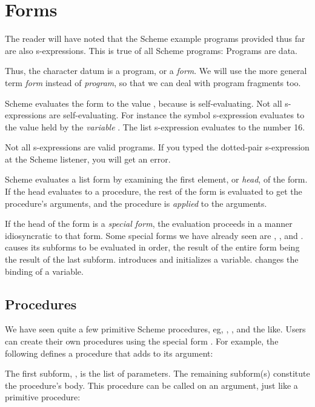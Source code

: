 \chapter{Forms}

The reader will have noted that the Scheme example
programs provided thus far are also s-expressions.
This is true of all Scheme programs: Programs are data.

Thus, the character datum \q{#\c} is a program, or a
{\em form}.  We will use the more general term {\em
form} instead of {\em program}, so that we can deal
with program fragments too.

Scheme evaluates the form \q{#\c} to the value \q{#\c},
because \q{#\c} is self-evaluating.  Not all
s-expressions are self-evaluating.  For instance the
symbol s-expression
 evaluates to the value held by the {\em variable}
.  The list s-expression
evaluates to the number 16.

Not all s-expressions are valid programs.  If you typed
the dotted-pair s-expression  at the Scheme
listener, you will get an error.

Scheme evaluates a list form by examining the first
element, or {\em head}, of the form.  If the head
evaluates to a procedure, the rest of the form is
evaluated to get the procedure's arguments, and the
procedure is {\em applied} to the arguments. 

If the head of the form is a {\em special form}, the
evaluation proceeds in a manner idiosyncratic to that
form.  Some special forms we have already seen
are , , and .   causes its
subforms to be evaluated in order, the result of the
entire form being the result of the last subform.
 introduces and initializes a variable.
 changes the binding of a variable.  

\section{Procedures}

We have seen quite a few primitive Scheme procedures,
eg, , , and the like.  Users
can create their own procedures using the special form
.  For example, the following defines a
procedure that adds  to its argument:


The first subform, , is the list of parameters.
The remaining subform(s) constitute the procedure's
body.  This procedure can be called on an argument,
just like a primitive procedure:

